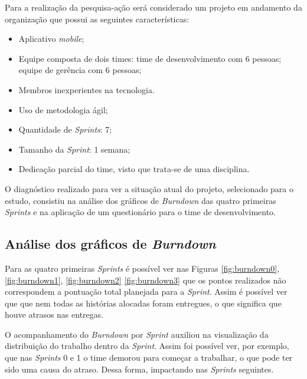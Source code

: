 Para a realização da pesquisa-ação será considerado um projeto em andamento da organização que possui as seguintes características:


\begin{itemize}
	\item Aplicativo \textit{mobile};
	\item Equipe composta de dois times:
		 time de desenvolvimento com 6 pessoas;
		 equipe de gerência com 6 pessoas;
	\item Membros inexperientes na tecnologia.
	\item Uso de metodologia ágil;
	\item Quantidade de \textit{Sprints}: 7;
	\item Tamanho da \textit{Sprint}: 1 semana;
	\item Dedicação parcial do time, visto que trata-se de uma disciplina.
\end{itemize}



O diagnóstico realizado para ver a situação atual do projeto, selecionado para o estudo, consistiu na análise
	dos gráficos de \textit{Burndown} das quatro primeiras \textit{Sprints} e na aplicação de um questionário para o
	time de desenvolvimento.

	\subsection{Análise dos gráficos de \textit{Burndown}}

	Para as quatro primeiras \textit{Sprints} é possível ver nas Figuras \ref{fig:burndown0}, \ref{fig:burndown1}, \ref{fig:burndown2}
	\ref{fig:burndown3} que os pontos realizados não correspondem a pontuação total planejada para a \textit{Sprint}.
	Assim é possível ver que que nem todas as histórias alocadas foram entregues, o que significa que houve atrasos nas entregas.

	O acompanhamento do \textit{Burndown} por \textit{Sprint} auxiliou na visualização da distribuição do trabalho dentro da \textit{Sprint}.
	Assim foi possível ver, por exemplo, que nas \textit{Sprints} 0 e 1 o time demorou para começar a trabalhar, o que pode ter sido uma causa do atraso. Dessa forma, impactando nas \textit{Sprints} seguintes.

